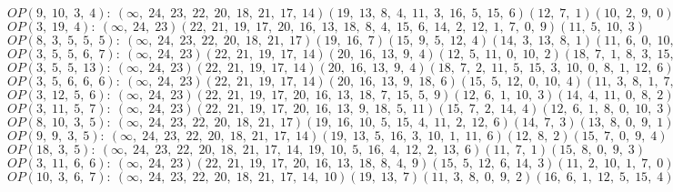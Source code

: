 $OP(9, \;10, \;3, \;4): \:(\infty, \;24, \;23, \;22, \;20, \;18, \;21, \;17, \;14)(19, \;13, \;8, \;4, \;11, \;3, \;16, \;5, \;15, \;6)(12, \;7, \;1)(10, \;2, \;9, \;0)$\\
$OP(3, \;19, \;4): \:(\infty, \;24, \;23)(22, \;21, \;19, \;17, \;20, \;16, \;13, \;18, \;8, \;4, \;15, \;6, \;14, \;2, \;12, \;1, \;7, \;0, \;9)(11, \;5, \;10, \;3)$\\
$OP(8, \;3, \;5, \;5, \;5): \:(\infty, \;24, \;23, \;22, \;20, \;18, \;21, \;17)(19, \;16, \;7)(15, \;9, \;5, \;12, \;4)(14, \;3, \;13, \;8, \;1)(11, \;6, \;0, \;10, \;2)$\\
$OP(3, \;5, \;5, \;6, \;7): \:(\infty, \;24, \;23)(22, \;21, \;19, \;17, \;14)(20, \;16, \;13, \;9, \;4)(12, \;5, \;11, \;0, \;10, \;2)(18, \;7, \;1, \;8, \;3, \;15, \;6)$\\
$OP(3, \;5, \;5, \;13): \:(\infty, \;24, \;23)(22, \;21, \;19, \;17, \;14)(20, \;16, \;13, \;9, \;4)(18, \;7, \;2, \;11, \;5, \;15, \;3, \;10, \;0, \;8, \;1, \;12, \;6)$\\
$OP(3, \;5, \;6, \;6, \;6): \:(\infty, \;24, \;23)(22, \;21, \;19, \;17, \;14)(20, \;16, \;13, \;9, \;18, \;6)(15, \;5, \;12, \;0, \;10, \;4)(11, \;3, \;8, \;1, \;7, \;2)$\\
$OP(3, \;12, \;5, \;6): \:(\infty, \;24, \;23)(22, \;21, \;19, \;17, \;20, \;16, \;13, \;18, \;7, \;15, \;5, \;9)(12, \;6, \;1, \;10, \;3)(14, \;4, \;11, \;0, \;8, \;2)$\\
$OP(3, \;11, \;5, \;7): \:(\infty, \;24, \;23)(22, \;21, \;19, \;17, \;20, \;16, \;13, \;9, \;18, \;5, \;11)(15, \;7, \;2, \;14, \;4)(12, \;6, \;1, \;8, \;0, \;10, \;3)$\\
$OP(8, \;10, \;3, \;5): \:(\infty, \;24, \;23, \;22, \;20, \;18, \;21, \;17)(19, \;16, \;10, \;5, \;15, \;4, \;11, \;2, \;12, \;6)(14, \;7, \;3)(13, \;8, \;0, \;9, \;1)$\\
$OP(9, \;9, \;3, \;5): \:(\infty, \;24, \;23, \;22, \;20, \;18, \;21, \;17, \;14)(19, \;13, \;5, \;16, \;3, \;10, \;1, \;11, \;6)(12, \;8, \;2)(15, \;7, \;0, \;9, \;4)$\\
$OP(18, \;3, \;5): \:(\infty, \;24, \;23, \;22, \;20, \;18, \;21, \;17, \;14, \;19, \;10, \;5, \;16, \;4, \;12, \;2, \;13, \;6)(11, \;7, \;1)(15, \;8, \;0, \;9, \;3)$\\
$OP(3, \;11, \;6, \;6): \:(\infty, \;24, \;23)(22, \;21, \;19, \;17, \;20, \;16, \;13, \;18, \;8, \;4, \;9)(15, \;5, \;12, \;6, \;14, \;3)(11, \;2, \;10, \;1, \;7, \;0)$\\
$OP(10, \;3, \;6, \;7): \:(\infty, \;24, \;23, \;22, \;20, \;18, \;21, \;17, \;14, \;10)(19, \;13, \;7)(11, \;3, \;8, \;0, \;9, \;2)(16, \;6, \;1, \;12, \;5, \;15, \;4)$\\
